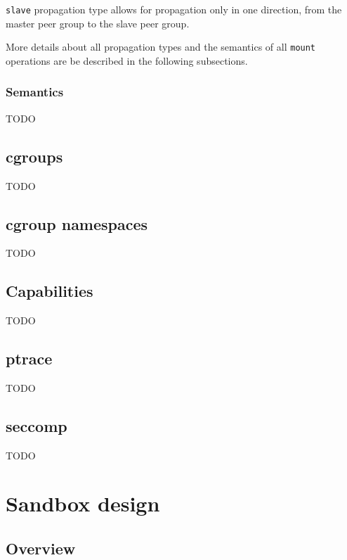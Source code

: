\documentclass[en]{pracamgr}
\begin{document}
\texttt{slave} propagation type allows for propagation only in one direction, from the master peer group to the slave peer group.

More details about all propagation types and the semantics of all \texttt{mount} operations are be described in the following subsections.

\subsection{Semantics}
TODO

\section{cgroups}
TODO

\section{cgroup namespaces}
TODO

\section{Capabilities}
TODO

\section{ptrace}
TODO

\section{seccomp} \label{section:seccomp}
TODO

\chapter{Sandbox design} \label{chapter:design}

\section{Overview}
\end{document}
